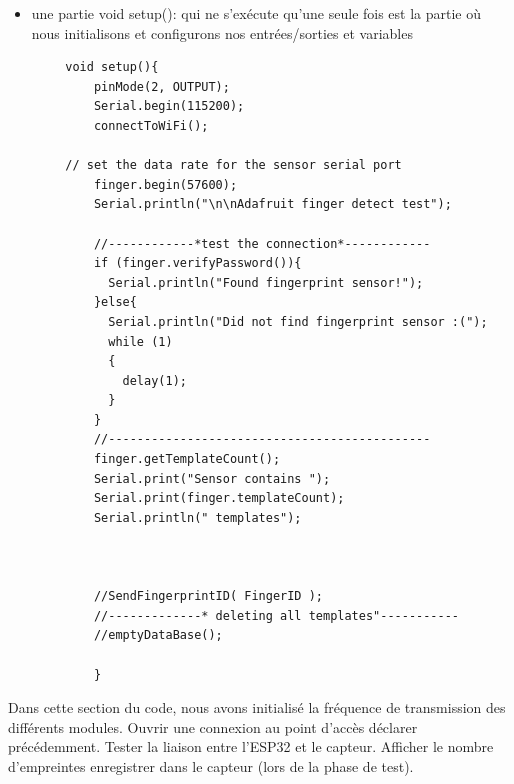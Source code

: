     \begin{itemize}
        \item [\textbullet] une partie void setup(): qui ne s’exécute qu’une seule fois est la partie où nous initialisons et configurons nos entrées/sorties et variables 
    \end{itemize}    
    \begin{verbatim}
        void setup(){
            pinMode(2, OUTPUT);
            Serial.begin(115200);
            connectToWiFi();

        // set the data rate for the sensor serial port
            finger.begin(57600);
            Serial.println("\n\nAdafruit finger detect test");
            
            //------------*test the connection*------------
            if (finger.verifyPassword()){
              Serial.println("Found fingerprint sensor!");
            }else{
              Serial.println("Did not find fingerprint sensor :(");
              while (1)
              {
                delay(1);
              }
            }
            //---------------------------------------------
            finger.getTemplateCount();
            Serial.print("Sensor contains ");
            Serial.print(finger.templateCount);
            Serial.println(" templates");
            
 
            
            //SendFingerprintID( FingerID );
            //-------------* deleting all templates"-----------
            //emptyDataBase();
        
            }
    \end{verbatim}
   Dans cette section du code, nous avons initialisé la fréquence de transmission des différents modules. Ouvrir une connexion au point d’accès déclarer précédemment. Tester la liaison entre l’ESP32 et le capteur. Afficher le nombre d’empreintes enregistrer dans le capteur (lors de la phase de test).      
        
